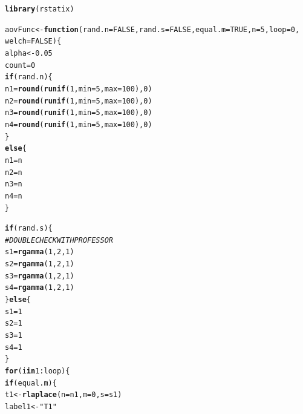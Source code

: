 \documentclass{article}\usepackage[]{graphicx}\usepackage[]{color}
\makeatletter
\newcommand{\hlnum}[1]{\textcolor[rgb]{0.686,0.059,0.569}{#1}}%
\newcommand{\hlstr}[1]{\textcolor[rgb]{0.192,0.494,0.8}{#1}}%
\newcommand{\hlcom}[1]{\textcolor[rgb]{0.678,0.584,0.686}{\textit{#1}}}%
\newcommand{\hlopt}[1]{\textcolor[rgb]{0,0,0}{#1}}%
\newcommand{\hlstd}[1]{\textcolor[rgb]{0.345,0.345,0.345}{#1}}%
\newcommand{\hlkwa}[1]{\textcolor[rgb]{0.161,0.373,0.58}{\textbf{#1}}}%
\newcommand{\hlkwb}[1]{\textcolor[rgb]{0.69,0.353,0.396}{#1}}%
\newcommand{\hlkwc}[1]{\textcolor[rgb]{0.333,0.667,0.333}{#1}}%
\newcommand{\hlkwd}[1]{\textcolor[rgb]{0.737,0.353,0.396}{\textbf{#1}}}%
\newenvironment{kframe}{%
 \def\at@end@of@kframe{}%
 \ifinner\ifhmode%
  \def\at@end@of@kframe{\end{minipage}}%
  \begin{minipage}{\columnwidth}%
 \fi\fi%
 \def\FrameCommand##1{\hskip\@totalleftmargin \hskip-\fboxsep
 \colorbox{shadecolor}{##1}\hskip-\fboxsep
     \hskip-\linewidth \hskip-\@totalleftmargin \hskip\columnwidth}%
 \MakeFramed {\advance\hsize-\width
   \@totalleftmargin\z@ \linewidth\hsize
   \@setminipage}}%
 {\par\unskip\endMakeFramed%
 \at@end@of@kframe}
\newenvironment{knitrout}{}{} %
\makeatother
\begin{document}
\begin{enumerate}
\begin{enumerate}
\begin{knitrout}
\color{fgcolor}\begin{kframe}
\begin{alltt}
\hlkwd{library}\hlstd{(rstatix)}
\end{alltt}


{\ttfamily\noindent\itshape\color{messagecolor}{\#\# \\\#\# Attaching package: 'rstatix'}}

{\ttfamily\noindent\itshape\color{messagecolor}{\#\# The following object is masked from 'package:stats':\\\#\# \\\#\# \ \ \ \ filter}}\begin{alltt}
\hlstd{aovFunc} \hlkwb{<-} \hlkwa{function}\hlstd{(}\hlkwc{rand.n}\hlstd{=}\hlnum{FALSE}\hlstd{,} \hlkwc{rand.s}\hlstd{=}\hlnum{FALSE}\hlstd{,} \hlkwc{equal.m}\hlstd{=}\hlnum{TRUE}\hlstd{,} \hlkwc{n}\hlstd{=}\hlnum{5}\hlstd{,} \hlkwc{loop}\hlstd{=}\hlnum{0}\hlstd{,}
                    \hlkwc{welch}\hlstd{=}\hlnum{FALSE}\hlstd{)\{}
  \hlstd{alpha}\hlkwb{<-}\hlnum{0.05}
  \hlstd{count}\hlkwb{=}\hlnum{0}
  \hlkwa{if}\hlstd{(rand.n)\{}
    \hlstd{n1}\hlkwb{=}\hlkwd{round}\hlstd{(}\hlkwd{runif}\hlstd{(}\hlnum{1}\hlstd{,} \hlkwc{min}\hlstd{=}\hlnum{5}\hlstd{,} \hlkwc{max}\hlstd{=}\hlnum{100}\hlstd{),}\hlnum{0}\hlstd{)}
    \hlstd{n2}\hlkwb{=}\hlkwd{round}\hlstd{(}\hlkwd{runif}\hlstd{(}\hlnum{1}\hlstd{,} \hlkwc{min}\hlstd{=}\hlnum{5}\hlstd{,} \hlkwc{max}\hlstd{=}\hlnum{100}\hlstd{),}\hlnum{0}\hlstd{)}
    \hlstd{n3}\hlkwb{=}\hlkwd{round}\hlstd{(}\hlkwd{runif}\hlstd{(}\hlnum{1}\hlstd{,} \hlkwc{min}\hlstd{=}\hlnum{5}\hlstd{,} \hlkwc{max}\hlstd{=}\hlnum{100}\hlstd{),}\hlnum{0}\hlstd{)}
    \hlstd{n4}\hlkwb{=}\hlkwd{round}\hlstd{(}\hlkwd{runif}\hlstd{(}\hlnum{1}\hlstd{,} \hlkwc{min}\hlstd{=}\hlnum{5}\hlstd{,} \hlkwc{max}\hlstd{=}\hlnum{100}\hlstd{),}\hlnum{0}\hlstd{)}
  \hlstd{\}}
  \hlkwa{else}\hlstd{\{}
    \hlstd{n1}\hlkwb{=}\hlstd{n}
    \hlstd{n2}\hlkwb{=}\hlstd{n}
    \hlstd{n3}\hlkwb{=}\hlstd{n}
    \hlstd{n4}\hlkwb{=}\hlstd{n}
  \hlstd{\}}

  \hlkwa{if}\hlstd{(rand.s)\{}
    \hlcom{#DOUBLE CHECK WITH PROFESSOR}
    \hlstd{s1}\hlkwb{=}\hlkwd{rgamma}\hlstd{(}\hlnum{1}\hlstd{,} \hlnum{2}\hlstd{,} \hlnum{1}\hlstd{)}
    \hlstd{s2}\hlkwb{=}\hlkwd{rgamma}\hlstd{(}\hlnum{1}\hlstd{,} \hlnum{2}\hlstd{,} \hlnum{1}\hlstd{)}
    \hlstd{s3}\hlkwb{=}\hlkwd{rgamma}\hlstd{(}\hlnum{1}\hlstd{,} \hlnum{2}\hlstd{,} \hlnum{1}\hlstd{)}
    \hlstd{s4}\hlkwb{=}\hlkwd{rgamma}\hlstd{(}\hlnum{1}\hlstd{,} \hlnum{2}\hlstd{,} \hlnum{1}\hlstd{)}
  \hlstd{\}}\hlkwa{else}\hlstd{\{}
    \hlstd{s1}\hlkwb{=}\hlnum{1}
    \hlstd{s2}\hlkwb{=}\hlnum{1}
    \hlstd{s3}\hlkwb{=}\hlnum{1}
    \hlstd{s4}\hlkwb{=}\hlnum{1}
  \hlstd{\}}
  \hlkwa{for}\hlstd{(i} \hlkwa{in} \hlnum{1}\hlopt{:}\hlstd{loop)\{}
    \hlkwa{if}\hlstd{(equal.m)\{}
      \hlstd{t1}\hlkwb{<-}\hlkwd{rlaplace}\hlstd{(}\hlkwc{n}\hlstd{=n1,} \hlkwc{m}\hlstd{=}\hlnum{0}\hlstd{,} \hlkwc{s}\hlstd{=s1)}
      \hlstd{label1}\hlkwb{<-}\hlstr{"T1"}


\end{alltt}
\end{kframe}
\end{knitrout}
\end{enumerate}
\end{enumerate}
\end{document}
